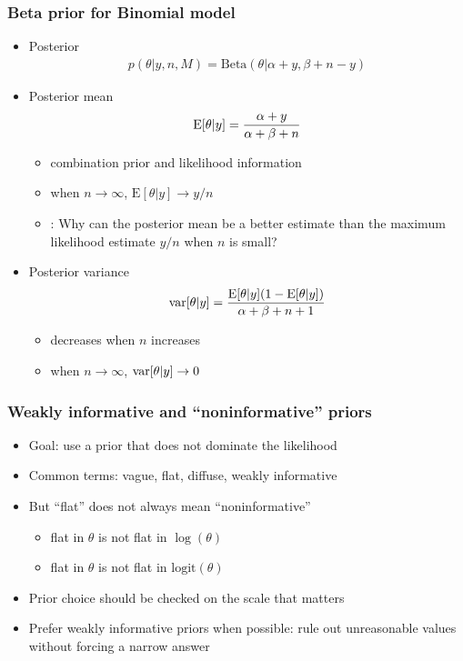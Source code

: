 \documentclass[10pt]{beamer}
\begin{document}
\begin{frame}
  \frametitle{Beta prior for Binomial model}

  \begin{itemize}
  \item Posterior
    \baselineskip
    \begin{align*}
      p(\theta|y,n,M) = \text{Beta}(\theta|\alpha+y,\beta+n-y)
    \end{align*}
    \item Posterior mean
    \baselineskip
    \begin{align*}
      \mathrm{E}[\theta|y] = \frac{\alpha+y}{\alpha+\beta+n}
    \end{align*}
    \begin{itemize}
    \item combination prior and likelihood information
    \item when $n\rightarrow\infty$, $\text{E}[\theta|y]\rightarrow y/n$
    \item {}: Why can the posterior mean be a better
      estimate than the maximum likelihood estimate $y/n$ when $n$ is small?
    \end{itemize}
    \pause
  \item  Posterior variance
    \baselineskip
    \begin{align*}
      \mathrm{var}[\theta|y]=\frac{\mathrm{E}[\theta|y](1-\mathrm{E}[\theta|y])}{\alpha+\beta+n+1}
    \end{align*}
    \begin{itemize}
    \item decreases when $n$ increases
    \item when $n\rightarrow\infty$, $\mathrm{var}[\theta|y]\rightarrow 0$
    \end{itemize}
  \end{itemize}

\end{frame}

\begin{frame}
\frametitle{Weakly informative and ``noninformative'' priors}

\begin{itemize}
  \item Goal: use a prior that does not dominate the likelihood
  \item Common terms: vague, flat, diffuse, weakly informative
  \pause
  \item But ``flat'' does not always mean ``noninformative''
  \begin{itemize}
    \item flat in $\theta$ is not flat in $\log(\theta)$
    \item flat in $\theta$ is not flat in $\mathrm{logit}(\theta)$
  \end{itemize}
  \pause
  \item Prior choice should be checked on the scale that matters
  \item Prefer weakly informative priors when possible:
    rule out unreasonable values without forcing a narrow answer
\end{itemize}

\end{frame}
\end{document}
